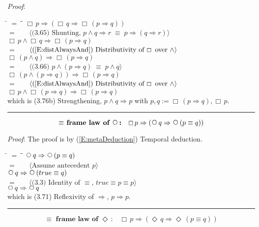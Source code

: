 \documentclass[12pt, fleqn, leqno]{article}
\newcommand{\lgap}{2pt}                             %
\newcommand{\mymathindent}{24pt}                    %
\newcommand{\equivs}{\ensuremath{\;\equiv\;}}       %
\newcommand{\impl}{\ensuremath{\Rightarrow}}        %
\newcommand{\Next}{\;\,\text{\raisebox{3.5pt}{\circle{6}}}}
\newcommand{\Event}{\Diamond\,}
\newcommand{\Always}{\Box\,}
\newcommand{\myqed}{\rule[-.23ex]{1.2ex}{2.0ex}}
\newcommand{\myqedtab}{\hspace{384pt}}              %
\newcommand{\Gll} {\langle}                         %
\newcommand{\Ggg} {\rangle}                         %
\newcommand{\Hint}[1]     {\ \ \ $\Gll              \mbox{#1} \Ggg$ }   %
\begin{document}
\emph{Proof}: 
\begin{tabbing}
\hspace{\mymathindent} \= $= \;$ \= \myqedtab \= \kill
  \> \>   $\Always p \impl (\Always q \impl \Always (p \impl q))$\\[\lgap]
  \> $=$  \>  \Hint{(3.65) Shunting, $p\land q\impl r\equivs p\impl (q\impl r)$}\\[\lgap]
  \> \>   $\Always p \land \Always q \impl \Always (p \impl q)$\\[\lgap]
  \> $=$  \>  \Hint{(\ref{E:distAlwaysAnd}) Distributivity of $\Always$ over $\land$}\\[\lgap]
  \> \>   $\Always (p \land q) \impl \Always (p \impl q)$\\[\lgap]
  \> $=$  \>  \Hint{(3.66) $p\land (p\impl q) \equivs p\land q$}\\[\lgap]
  \> \>   $\Always (p \land (p \impl q)) \impl \Always (p \impl q)$\\[\lgap]
  \> $=$  \>  \Hint{(\ref{E:distAlwaysAnd}) Distributivity of $\Always$ over $\land$}\\[\lgap]
  \> \>   $\Always p \land \Always (p \impl q) \impl \Always (p \impl q)$\\[\lgap]
   \> which is (3.76b) Strengthening, $p\land q \impl p$ with $p, q :=\Always (p \impl q) ,\Always p$. \quad \myqed
\end{tabbing}
\begin{equation}\label{E:equivframelawnext}
\textbf{$\equiv$ frame law of $\Next$:}\quad \Always p \impl (\Next q \impl \Next (p \equiv q))
\end{equation}

\emph{Proof}: The proof is by (\ref{E:metaDeduction}) Temporal deduction.
\begin{tabbing}
\hspace{\mymathindent} \= $= \;$ \= \myqedtab \= \kill
  \> \>   $\Next q \impl \Next (p \equiv q)$\\[\lgap]
  \> $=$  \>  \Hint{Assume antecedent $p$}\\[\lgap]
  \> \>   $\Next q \impl \Next (true \equiv q)$\\[\lgap]
  \> $=$  \>  \Hint{(3.3) Identity of $\equiv$, $true \equiv p \equiv p$}\\[\lgap]
  \> \>   $\Next q \impl \Next q$\\[\lgap]
  \> which is (3.71) Reflexivity of $\impl$, $p\impl p$. \quad \myqed
  \end{tabbing}
\begin{equation}\label{E:equivframelawEvent}
\textbf{$\equiv$ frame law of $\Event$:}\quad \Always p \impl (\Event q \impl \Event (p \equiv q))
\end{equation}
\end{document}
